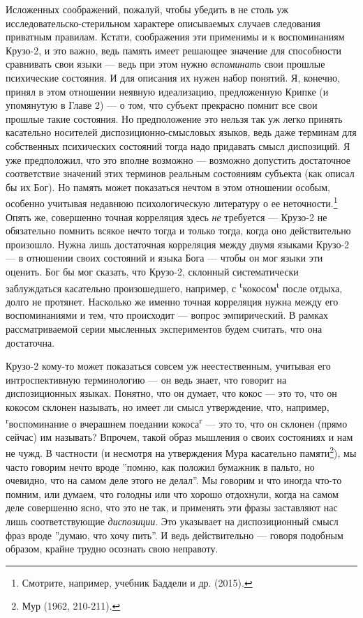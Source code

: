 \documentclass[11pt]{book}
\begin{document}
Исложенных соображений, пожалуй, чтобы убедить в не столь уж исследовательско-стерильном характере описываемых случаев следования приватным правилам. Кстати, соображения эти применимы и к воспоминаниям Крузо-2, и это важно, ведь память имеет решающее значение для способности сравнивать свои языки --- ведь при этом нужно \textit{вспоминать} свои прошлые психические состояния. И для описания их нужен набор понятий. Я, конечно, принял в этом отношении неявную идеализацию, предложенную Крипке (и упомянутую в Главе 2) --- о том, что субъект прекрасно помнит все свои прошлые такие состояния. Но предположение это нельзя так уж легко принять касательно носителей диспозиционно-смысловых языков, ведь даже терминам для собственных психических состояний тогда надо придавать смысл диспозиций. Я уже предположил, что это вполне возможно --- возможно допустить достаточное соответствие значений этих терминов реальным состояниям субъекта (как описал бы их Бог). Но память может показаться нечтом в этом отношении особым, особенно учитывая недавнюю психологическую литературу о ее неточности.\footnote{Смотрите, например, учебник Баддели и др. (2015).} Опять же, совершенно точная корреляция здесь \textit{не} требуется --- Крузо-2 не обязательно помнить всякое нечто тогда и только тогда, когда оно действительно произошло. Нужна лишь достаточная корреляция между двумя языками Крузо-2 --- в отношении своих состояний и языка Бога --- чтобы он мог языки эти оценить. Бог бы мог сказать, что Крузо-2, склонный систематически заблуждаться касательно произошедшего, например, с \textsuperscript{t}кокосом\textsuperscript{t} после отдыха, долго не протянет. Насколько же именно точная корреляция нужна между его воспоминаниями и тем, что происходит --- вопрос эмпирический. В рамках рассматриваемой серии мысленных экспериментов будем считать, что она достаточна.

Крузо-2 кому-то может показаться совсем уж неестественным, учитывая его интроспективную терминологию --- он ведь знает, что говорит на диспозиционных языках. Понятно, что он думает, что кокос --- это то, что он кокосом склонен называть, но имеет ли смысл утверждение, что, например, \textsuperscript{r}воспоминание о вчерашнем поедании кокоса\textsuperscript{r} --- это то, что он склонен (прямо сейчас) им называть? Впрочем, такой образ мышления о своих состояниях и нам не чужд. В частности (и несмотря на утверждения Мура касательно памяти\footnote{Мур (1962, 210-211).}), мы часто говорим нечто вроде ''помню, как положил бумажник в пальто, но очевидно, что на самом деле этого не делал''. Мы говорим и что иногда что-то помним, или думаем, что голодны или что хорошо отдохнули, когда на самом деле совершенно ясно, что это не так, и применять эти фразы заставляют нас лишь соответствующие \textit{диспозиции}. Это указывает на диспозиционный смысл фраз вроде ''думаю, что хочу пить''. И ведь действительно --- говоря подобным образом, крайне трудно осознать свою неправоту.
\end{document}
